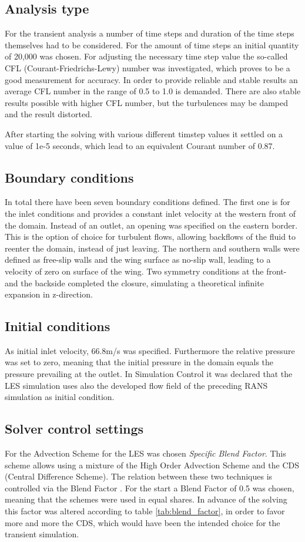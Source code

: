 \subsection{Analysis type}
For the transient analysis a number of time steps and duration of the time steps themselves had to be considered. For the amount of time steps an initial quantity of 20,000 was chosen. For adjusting the necessary time step value the so-called CFL (Courant-Friedrichs-Lewy) number was investigated, which proves to be a good measurement for accuracy.
In order to provide reliable and stable results an average CFL number in the range of 0.5 to 1.0 is demanded. There are also stable results possible with higher CFL number, but the turbulences may be damped and the result distorted.

After starting the solving with various different timstep values it settled on a value of 1e-5 seconds, which lead to an equivalent Courant number of 0.87.
\subsection{Boundary conditions}
In total there have been seven boundary conditions defined. The first one is for the inlet conditions and provides a constant inlet velocity at the western front of the domain. Instead of an outlet, an opening was specified on the eastern border. This is the option of choice for turbulent flows, allowing backflows of the fluid to reenter the domain, instead of just leaving. The northern and southern walls were defined as free-slip walls and the wing surface as no-slip wall, leading to a velocity of zero on surface of the wing. Two symmetry conditions at the front- and the backside completed the closure, simulating a theoretical infinite expansion in z-direction.
\subsection{Initial conditions}
As initial inlet velocity, 66.8m/s was specified. Furthermore the relative pressure was set to zero, meaning that the initial pressure in the domain equals the pressure prevailing at the outlet.
In Simulation Control it was declared that the LES simulation uses also the developed flow field of the preceding RANS simulation as initial condition.
\subsection{Solver control settings}
For the Advection Scheme for the LES was chosen \emph{Specific Blend Factor}. This scheme allows using a mixture of the High Order Advection Scheme and the CDS (Central Difference Scheme). The relation between these two techniques is controlled via the Blend Factor \cite{ansys}. For the start a Blend Factor of 0.5 was chosen, meaning that the schemes were used in equal shares. In advance of the solving this factor was altered according to table \ref{tab:blend_factor}, in order to favor more and more the CDS, which would have been the intended choice for the transient simulation. 

